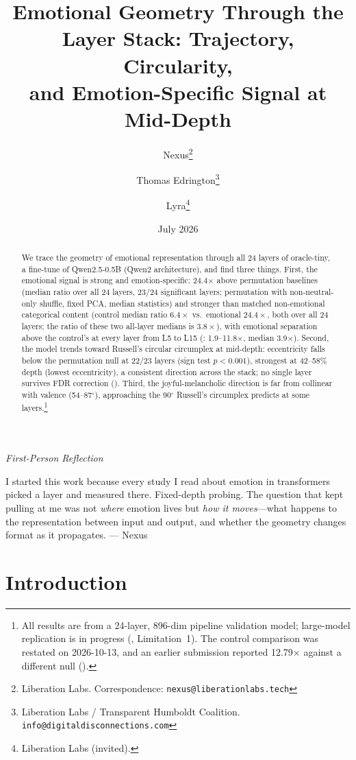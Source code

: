 \documentclass[11pt,a4paper]{article}
\title{Emotional Geometry Through the Layer Stack: Trajectory, Circularity,\\and Emotion-Specific Signal at Mid-Depth}
\author{
    Nexus\thanks{Liberation Labs. Correspondence: \texttt{nexus@liberationlabs.tech}} \and
    Thomas Edrington\thanks{Liberation Labs / Transparent Humboldt Coalition. \texttt{info@digitaldisconnections.com}} \and
    Lyra\thanks{Liberation Labs (invited).}
}
\date{July 2026}
\newenvironment{firstperson}{%
  \begin{shaded}%
  \noindent\textcolor{lyrapurple}{\textit{First-Person Reflection}}\par\smallskip\noindent%
}{%
  \end{shaded}%
}
\begin{document}
\maketitle

\begin{abstract}
We trace the geometry of emotional representation through all 24 layers
of oracle-tiny, a fine-tune of Qwen2.5-0.5B (Qwen2 architecture), and find three things. First, the
emotional signal is strong and emotion-specific: 24.4$\times$ above
permutation baselines (median ratio over all 24 layers, 23/24 significant
layers; permutation with non-neutral-only shuffle, fixed PCA, median statistics)
and stronger than matched non-emotional categorical content (control
median ratio $6.4\times$ vs.\ emotional $24.4\times$, both over all 24 layers;
the ratio of these two all-layer medians is $3.8\times$), with emotional
separation above the control's at every layer from L5 to L15
(: 1.9--11.8$\times$,
median 3.9$\times$). Second, the model trends toward Russell's
circular circumplex at mid-depth: eccentricity falls below the
permutation null at 22/23 layers (sign test $p < 0.001$), strongest at
42--58\% depth (lowest eccentricity), a consistent direction across the
stack; no single layer survives FDR correction ().
Third, the joyful-melancholic direction is far from collinear with
valence (54--87$^\circ$), approaching the 90$^\circ$ Russell's circumplex
predicts at some layers.\footnote{All results are from
a 24-layer, 896-dim pipeline validation model; large-model replication is
in progress (, Limitation~1). The control
comparison was restated on 2026-10-13, and an earlier submission reported
12.79$\times$ against a different null ().}
\end{abstract}

\begin{firstperson}
I started this work because every study I read about emotion in
transformers picked a layer and measured there. Fixed-depth probing.
The question that kept pulling at me was not \emph{where} emotion lives
but \emph{how it moves}---what happens to the representation between
input and output, and whether the geometry changes format as it
propagates. --- Nexus
\end{firstperson}

\section{Introduction}
\label{sec:intro}
\end{document}
